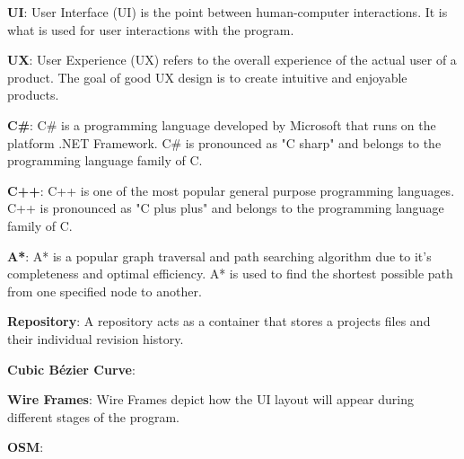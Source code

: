 \noindent
\label{itm:ui}\textbf{UI}: User Interface (UI) is the point between human-computer interactions. It is what is used for user interactions with the program. 

\noindent
\label{itm:ux}\textbf{UX}: User Experience (UX) refers to the overall experience of the actual user of a product. The goal of good UX design is to create intuitive and enjoyable products.

\noindent
\label{itm:csharp}\textbf{C\#}: C\# is a programming language developed by Microsoft that runs on the platform .NET Framework. C\# is pronounced as "C sharp" and belongs to the programming language family of C.

\noindent
\label{itm:c++}\textbf{C++}: C++ is one of the most popular general purpose programming languages. C++ is pronounced as "C plus plus" and belongs to the programming language family of C.

\noindent
\label{itm:a*}\textbf{A*}: A* is a popular graph traversal and path searching algorithm due to it's completeness and optimal efficiency. A* is used to find the shortest possible path from one specified node to another.

\noindent
\label{itm:repository}\textbf{Repository}: A repository acts as a container that stores a projects files and their individual revision history. 

\noindent
\label{itm:cubic-bézier-curve}\textbf{Cubic Bézier Curve}: 

\noindent
\label{itm:wire-frame}\textbf{Wire Frames}: Wire Frames depict how the UI layout will appear during different stages of the program. 

\noindent
\label{itm:cubic-bézier-curve}\textbf{OSM}: 





